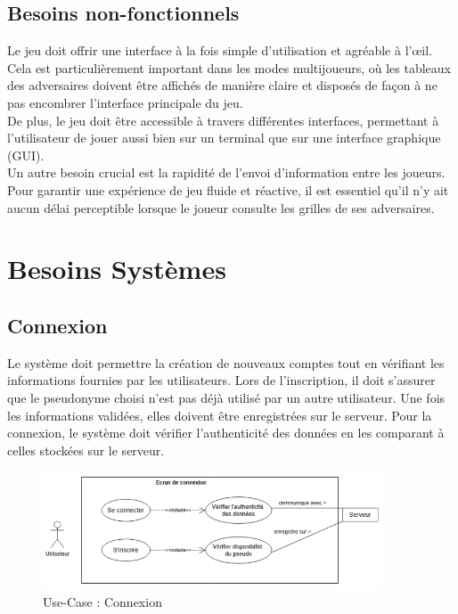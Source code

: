\documentclass{report}
\begin{document}
\section{Besoins non-fonctionnels}

\noindent Le jeu doit offrir une interface à la fois simple d’utilisation et agréable à l’œil. Cela est particulièrement important dans les modes multijoueurs, où les tableaux des adversaires doivent être affichés de manière claire et disposés de façon à ne pas encombrer l’interface principale du jeu. \\ 

\noindent De plus, le jeu doit être accessible à travers différentes interfaces, permettant à l’utilisateur de jouer aussi bien sur un terminal que sur une interface graphique (GUI). \\

\noindent Un autre besoin crucial est la rapidité de l’envoi d’information entre les joueurs. Pour garantir une expérience de jeu fluide et réactive, il est essentiel qu’il n’y ait aucun délai perceptible lorsque le joueur consulte les grilles de ses adversaires.



\chapter{Besoins Systèmes}
\label{chap:sys_req}

\section{Connexion}

\noindent Le système doit permettre la création de nouveaux comptes tout en vérifiant les informations fournies par les utilisateurs. Lors de l'inscription, il doit s'assurer que le pseudonyme choisi n'est pas déjà utilisé par un autre utilisateur. Une fois les informations validées, elles doivent être enregistrées sur le serveur. Pour la connexion, le système doit vérifier l'authenticité des données en les comparant à celles stockées sur le serveur.

\vspace{-1em}

\begin{figure}[H]
    \centering
     \includegraphics[width=0.9\textwidth, keepaspectratio]{src/sys_req/connexion.png}
    \caption{Use-Case : Connexion}
    \label{fig:use_case_connexion_sys_req}
\end{figure}
\end{document}
